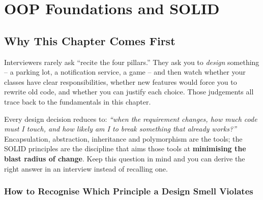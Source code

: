 \chapter{OOP Foundations and SOLID}

\section{Why This Chapter Comes First}
\label{sec:lld-intro}

Interviewers rarely ask ``recite the four pillars.'' They ask you to
\emph{design} something -- a parking lot, a notification service, a game --
and then watch whether your classes have clear responsibilities, whether
new features would force you to rewrite old code, and whether you can
justify each choice. Those judgements all trace back to the fundamentals
in this chapter.

\begin{ideabox}
Every design decision reduces to: \emph{``when the requirement changes,
how much code must I touch, and how likely am I to break something that
already works?''} Encapsulation, abstraction, inheritance and
polymorphism are the tools; the SOLID principles are the discipline that
aims those tools at \textbf{minimising the blast radius of change}. Keep
this question in mind and you can derive the right answer in an interview
instead of recalling one.
\end{ideabox}

\subsection*{How to Recognise Which Principle a Design Smell Violates}

